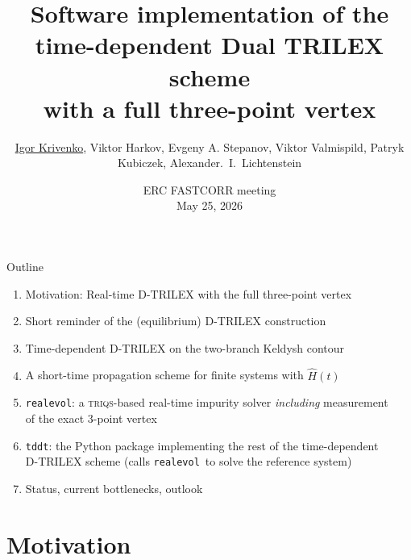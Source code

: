 \documentclass[10pt,aspectratio=169]{beamer}
\title[Time-dependent Dual TRILEX implementation]{%
  Software implementation of the time-dependent Dual TRILEX scheme\\
  with a full three-point vertex}
\subtitle{}
\author[I.\,Krivenko et al]{\underline{Igor Krivenko}, Viktor Harkov,
        Evgeny A. Stepanov, Viktor Valmispild, Patryk Kubiczek,
        Alexander.~I.~Lichtenstein}
\date[ERC-FASTCORR 2026]{ERC FASTCORR meeting\\May 25, 2026}
\newcommand{\realevol}{\texttt{realevol}}
\newcommand{\tddt}{\texttt{tddt}}
\newcommand{\triqs}{\textsc{triqs}}
\begin{document}
\begin{frame}
  \titlepage
\end{frame}

\begin{frame}{Outline}
  \begin{enumerate}
    \item Motivation: Real-time D-TRILEX with the full three-point vertex
    \item Short reminder of the (equilibrium) D-TRILEX construction
    \item Time-dependent D-TRILEX on the two-branch Keldysh contour
    \item A short-time propagation scheme for finite systems with $\hat H(t)$
    \item \realevol: a \triqs-based real-time impurity solver
          \emph{including} measurement\\ of the exact 3-point vertex
    \item \tddt: the Python package implementing the rest of
          the time-dependent\\ D-TRILEX scheme (calls \realevol\ to solve the reference system)
    \item Status, current bottlenecks, outlook
  \end{enumerate}
\end{frame}

\section{Motivation}
\end{document}
